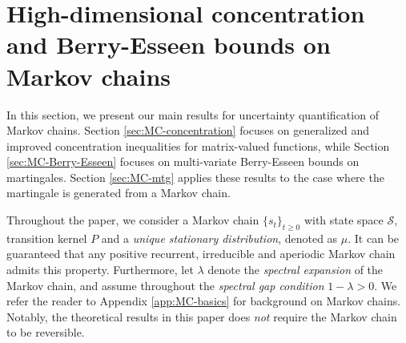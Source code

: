 \section{High-dimensional concentration and Berry-Esseen bounds on Markov chains}%
In this section, we present our main results for uncertainty quantification of Markov chains. Section \ref{sec:MC-concentration} focuses on generalized and improved concentration inequalities for matrix-valued functions, while Section \ref{sec:MC-Berry-Esseen} focuses on multi-variate Berry-Esseen bounds on martingales. Section \ref{sec:MC-mtg} applies these results to the case where the martingale is generated from a Markov chain. 

Throughout the paper, we consider a Markov chain $\{s_t\}_{t \geq 0}$ with state space $\mathcal{S}$, transition kernel $P$ and a \emph{unique stationary distribution}, denoted as $\mu$. It can be guaranteed that any positive recurrent, irreducible and aperiodic Markov chain admits this property.
Furthermore, let $\lambda$ denote the \emph{spectral expansion} of the Markov chain, and assume throughout the \emph{spectral gap condition} $1-\lambda > 0$. We refer the reader to Appendix \ref{app:MC-basics} for background on Markov chains. Notably, the theoretical results in this paper does \emph{not} require the Markov chain to be reversible. %







